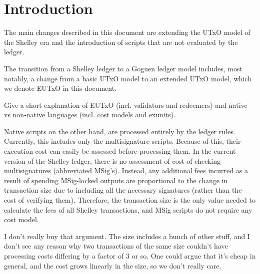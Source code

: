 \section{Introduction}

The main changes described in this document are extending the UTxO
model of the Shelley era and the introduction of scripts that are not
evaluated by the ledger.

The transition from a Shelley ledger to a Goguen ledger model includes, most
notably, a change from a basic UTxO model to an extended UTxO model, which
we denote EUTxO in this document.

\begin{note}
  Give a short explanation of EUTxO (incl. validators and redeemers)
  and native vs non-native languages (incl. cost models and exunits).
\end{note}

Native scripts on the other hand, are processed entirely by the ledger rules.
Currently, this includes only the multisignature scripts.
Because of this, their execution cost can easily be assessed before processing them.
In the current version of the Shelley ledger, there is no assessment of cost
of checking multisignatures (abbreviated MSig's). Instead, any additional fees 
incurred as a result of
spending MSig-locked outputs are proportional to the change in transaction
size due to including all the necessary signatures (rather than the
cost of verifying them). Therefore, the transaction size is the only
value needed to calculate the fees of all Shelley transactions, and MSig
scripts do not require any cost model.
\begin{note}
  I don't really buy that argument. The size includes a bunch of other
  stuff, and I don't see any reason why two transactions of the same
  size couldn't have processing costs differing by a factor of 3 or
  so. One could argue that it's cheap in general, and the cost grows
  linearly in the size, so we don't really care.
\end{note}
